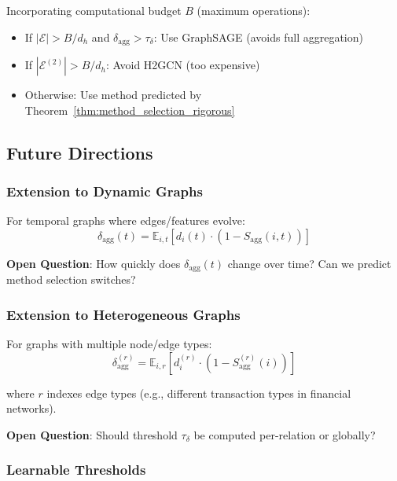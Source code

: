 \begin{corollary}
\label{cor:complexity_aware}
Incorporating computational budget $B$ (maximum operations):
\begin{itemize}
\item If $|\mathcal{E}| > B/d_h$ and $\delta_{\text{agg}} > \tau_\delta$: Use GraphSAGE (avoids full aggregation)
\item If $|\mathcal{E}^{(2)}| > B/d_h$: Avoid H2GCN (too expensive)
\item Otherwise: Use method predicted by Theorem~\ref{thm:method_selection_rigorous}
\end{itemize}
\end{corollary}

\subsection{Future Directions}

\subsubsection{Extension to Dynamic Graphs}

For temporal graphs where edges/features evolve:
\begin{equation}
\delta_{\text{agg}}(t) = \mathbb{E}_{i,t}\left[d_i(t) \cdot (1 - S_{\text{agg}}(i, t))\right]
\end{equation}

\textbf{Open Question}: How quickly does $\delta_{\text{agg}}(t)$ change over time? Can we predict method selection switches?

\subsubsection{Extension to Heterogeneous Graphs}

For graphs with multiple node/edge types:
\begin{equation}
\delta_{\text{agg}}^{(r)} = \mathbb{E}_{i, r}\left[d_i^{(r)} \cdot (1 - S_{\text{agg}}^{(r)}(i))\right]
\end{equation}

where $r$ indexes edge types (e.g., different transaction types in financial networks).

\textbf{Open Question}: Should threshold $\tau_\delta$ be computed per-relation or globally?

\subsubsection{Learnable Thresholds}

